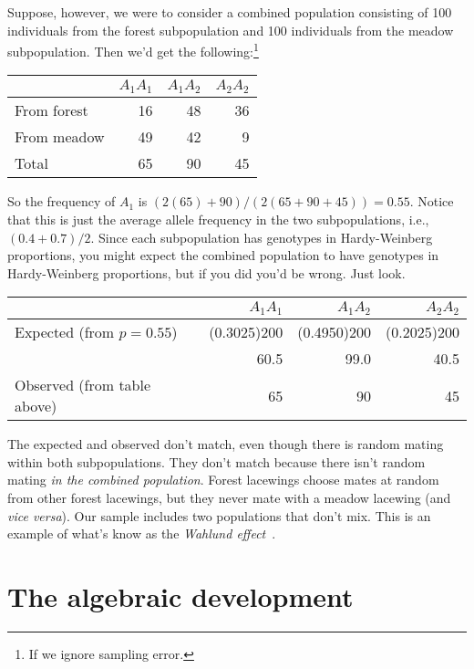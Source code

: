 Suppose, however, we were to consider a combined population consisting
of 100 individuals from the forest subpopulation and 100 individuals
from the meadow subpopulation. Then we'd get the
following:\footnote{If we ignore sampling error.}

\begin{center}
\begin{tabular}{l|rrr}
\hline\hline
       & $A_1A_1$ & $A_1A_2$ & $A_2A_2$ \\
\hline
From forest & 16  & 48       & 36 \\
From meadow & 49  & 42       & 9 \\
\hline
Total       & 65  & 90       & 45 \\
\hline
\end{tabular}
\end{center}
So the frequency of $A_1$ is $(2(65) + 90)/(2(65 + 90 + 45)) =
0.55$. Notice that this is just the average allele frequency in the
two subpopulations, i.e., $(0.4 + 0.7)/2$. Since each subpopulation has
genotypes in Hardy-Weinberg proportions, you might expect the combined
population to have genotypes in Hardy-Weinberg proportions, but if you did
you'd be wrong. Just look.

\begin{center}
\begin{tabular}{l|rrr}
\hline\hline
                            & $A_1A_1$ & $A_1A_2$ & $A_2A_2$ \\
\hline
Expected (from $p=0.55$)    & (0.3025)200 & (0.4950)200 & (0.2025)200 \\
                            & 60.5     & 99.0     & 40.5 \\
Observed (from table above) & 65       & 90       & 45 \\
\hline
\end{tabular}
\end{center}
The expected and observed don't match, even though there is random
mating within both subpopulations. They don't match because there
isn't random mating {\it in the combined population}. Forest lacewings
choose mates at random from other forest lacewings, but they never
mate with a meadow lacewing (and {\it vice versa\/}). Our sample
includes two populations that don't mix. This is an example of what's
know as the {\it Wahlund effect}~\cite{Wahlund-1928}.

\section*{The algebraic development}

